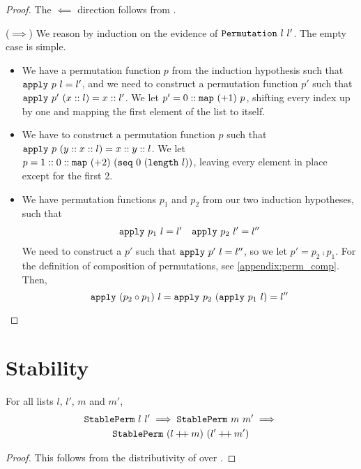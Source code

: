 \documentclass[sigplan,10pt,anonymous,review]{thesis}
\begin{document}
\permutationexiff*
\begin{proof}
  The $\impliedby$ direction follows from .

  ($\implies$) We reason by induction on the evidence of
  $\texttt{\textup{Permutation}}~l~l'$. The empty case is simple.
  \begin{itemize}
  \item We have a permutation function $p$ from the induction
    hypothesis such that $\texttt{\textup{apply}}~p~l = l'$, and we need to
    construct a permutation function $p'$ such that
    $\texttt{\textup{apply}}~p'~(x::l) = x :: l'$. We let $p' = 0 ::
    \texttt{\textup{map}}~(+1)~p$, shifting every index up by one and mapping
    the first element of the list to itself.
  \item We have to construct a permutation function $p$ such that
    $\texttt{\textup{apply}}~p~(y :: x :: l) = x :: y :: l$. We let $p = 1 :: 0 ::
    \texttt{\textup{map}}~(+2)~(\texttt{\textup{seq}}~0~(\texttt{\textup{length}}~l))$, leaving every
    element in place except for the first 2.
  \item We have permutation functions $p_1$ and $p_2$ from our two
    induction hypotheses, such that
    \begin{align*}
      \texttt{\textup{apply}}~p_1~l = l' && \texttt{\textup{apply}}~p_2~l' = l''
    \end{align*}
    We need to construct a $p'$ such that $\texttt{\textup{apply}}~p'~l=l''$, so
    we let $p' = p_2 \comp p_1$. For the definition of composition of
    permutations, see \cref{appendix:perm_comp}. Then,
    \begin{equation*}
      \texttt{\textup{apply}}~(p_2 \circ p_1)~l =
      \texttt{\textup{apply}}~p_2~(\texttt{\textup{apply}}~p_1~l) = l'' \qedhere
    \end{equation*}
  \end{itemize}
\end{proof}

\section{Stability}
\label{appendix:stability}

\begin{lemma}
  For all lists $l$, $l'$, $m$ and $m'$,
  \begin{gather*}
    \texttt{\textup{StablePerm}}~l~l' \implies \texttt{\textup{StablePerm}}~m~m' \implies \\
    \texttt{\textup{StablePerm}}~(l \mathbin{+\mkern-3mu+} m)~(l' \mathbin{+\mkern-3mu+} m')
  \end{gather*}
\end{lemma}
\begin{proof}
  This follows from the distributivity of  over .
\end{proof}
\end{document}
